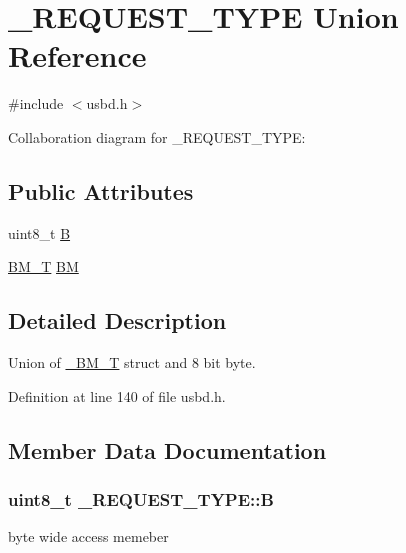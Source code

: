 \hypertarget{union__REQUEST__TYPE}{}\section{\+\_\+\+R\+E\+Q\+U\+E\+S\+T\+\_\+\+T\+Y\+PE Union Reference}
\label{union__REQUEST__TYPE}


{\ttfamily \#include $<$usbd.\+h$>$}



Collaboration diagram for \+\_\+\+R\+E\+Q\+U\+E\+S\+T\+\_\+\+T\+Y\+PE\+:
\subsection*{Public Attributes}
\begin{DoxyCompactItemize}
\item 
uint8\+\_\+t \hyperlink{union__REQUEST__TYPE_a4ea7b8b71f7922b27a4b7833afcd645d}{B}
\item 
\hyperlink{group__USBD__Core_ga0c191764322e096fa81c1228eb62e63f}{B\+M\+\_\+T} \hyperlink{union__REQUEST__TYPE_aeb4f47d17f203fbb11ffd16c454dde0c}{BM}
\end{DoxyCompactItemize}


\subsection{Detailed Description}
Union of \hyperlink{struct__BM__T}{\+\_\+\+B\+M\+\_\+T} struct and 8 bit byte. 

Definition at line 140 of file usbd.\+h.



\subsection{Member Data Documentation}
\subsubsection[{\texorpdfstring{B}{B}}]{\setlength{\rightskip}{0pt plus 5cm}uint8\+\_\+t \+\_\+\+R\+E\+Q\+U\+E\+S\+T\+\_\+\+T\+Y\+P\+E\+::B}\hypertarget{union__REQUEST__TYPE_a4ea7b8b71f7922b27a4b7833afcd645d}{}\label{union__REQUEST__TYPE_a4ea7b8b71f7922b27a4b7833afcd645d}
byte wide access memeber 

